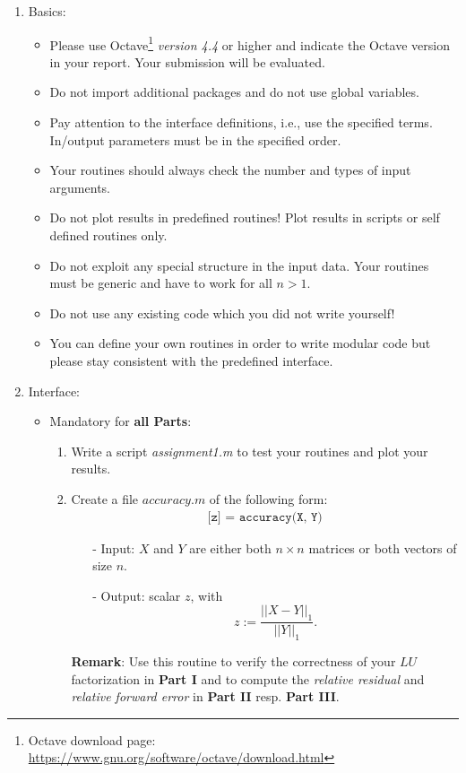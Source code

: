 \documentclass{scrartcl}
\begin{document}
\begin{enumerate}
	\item Basics:
	\begin{itemize}
		\item Please use Octave\footnote{Octave download page: \url{https://www.gnu.org/software/octave/download.html}} \textit{version 4.4} or higher and indicate the Octave version in your report. Your submission will be evaluated.
		\item Do not import additional packages and do not use global variables.
		\item Pay attention to the interface definitions, i.e., use the specified terms. In/output parameters must be in the specified order.
		\item Your routines should always check the number and types of input arguments.
		\item Do not plot results in predefined routines! Plot results in scripts or self defined routines only.
		\item Do not exploit any special structure in the input data. Your routines must be generic and have to work for all $n > 1$.
		\item Do not use any existing code which you did not write yourself!
		\item You can define your own routines in order to write modular code but please stay consistent with the predefined interface.
	\end{itemize}
	
	\item Interface:
	\begin{itemize}
		\item Mandatory for \textbf{all Parts}:
			\begin{enumerate}
        		\item Write a script \textit{assignment1.m} to test your routines and plot your results.\\
				\item Create a file $accuracy.m$ of the following form:
     			\begin{align*}
            		\texttt{[z] = accuracy(X, Y)}
        		\end{align*}
				\begin{itemize}
            		\item[-] Input: $X$ and $Y$ are either both $n \times n$ matrices or both vectors of size $n$.
            		\item[-] Output: scalar $z$, with
            		\begin{equation*}
	         			z := \frac{||X - Y||_1}{||Y||_1}.
            		\end{equation*}
        		\end{itemize}
        		\textbf{Remark}: Use this routine to verify the correctness of your $LU$ factorization in \textbf{Part I} and to compute the \textit{relative residual} and \textit{relative forward error} in \textbf{Part II} resp. \textbf{Part III}.\\
		\end{enumerate}
	

\end{itemize}
\end{enumerate}
\end{document}
